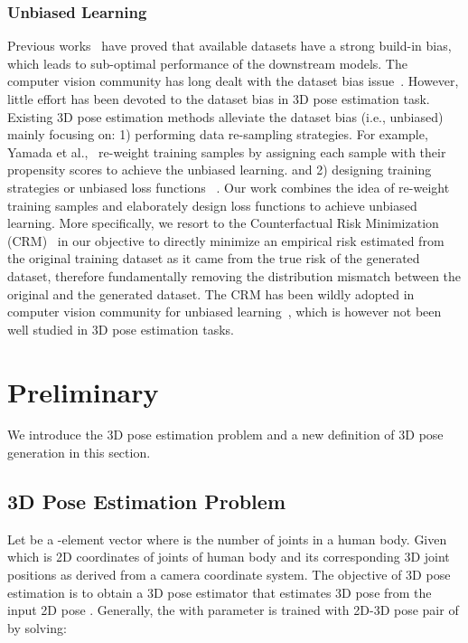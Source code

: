 \documentclass[runningheads]{llncs}
\begin{document}
\subsubsection{Unbiased Learning} 
Previous works~\cite{Unbiasedtraining1} have proved that available datasets have a strong build-in bias, which leads to sub-optimal performance of the downstream models.
The computer vision community has long dealt with the dataset bias issue~\cite{Unbiasedtraining1}. 
However, little effort has been devoted to the dataset bias in 3D pose estimation task. 
Existing 3D pose estimation methods alleviate the dataset bias (i.e., unbiased) mainly focusing on: 
1) performing data re-sampling strategies. 
For example, Yamada et al.,~\cite{Unbiasedtraining3} re-weight training samples by assigning each sample with their propensity scores to achieve the unbiased learning.  
and 2) designing training strategies or unbiased loss functions ~\cite{Unbiasedtraining3,Unbiasedtraining2}. 
Our work combines the idea of re-weight training samples and elaborately design loss functions to achieve unbiased learning.
More specifically, we resort to the Counterfactual Risk Minimization (CRM)~\cite{crmdebias1,crmdebias2} in our objective to directly minimize an empirical risk estimated from the original training dataset as it came from the true risk of the generated dataset, therefore fundamentally removing the distribution mismatch between the original and the generated dataset. 
The CRM has been wildly adopted in computer vision community for unbiased learning~\cite{crmcv1,crmcv2,Unbiasedtraining4}, which is however not been well studied in 3D pose estimation tasks. 

\section{Preliminary}
We introduce the 3D pose estimation problem and a new definition of 3D pose generation in this section. 
\subsection{3D Pose Estimation Problem}
Let  be a -element vector where  is the number of joints in a human body. 
Given  which is 2D coordinates of  joints of human body and its corresponding 3D joint positions  as derived from a camera coordinate system. 
The objective of 3D pose estimation is to obtain a 3D pose estimator  that estimates 3D pose  from the input 2D pose .
Generally, the  with parameter  is trained with 2D-3D pose pair of  by solving:
\end{document}
